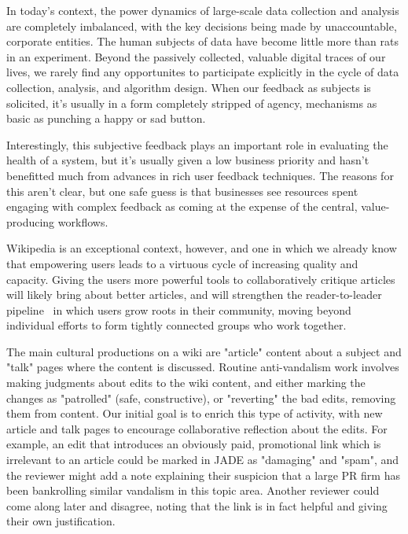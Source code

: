 \documentclass{sigchi-ext}
\begin{document}
In today's context, the power dynamics of large-scale data collection and analysis are completely imbalanced, with the key decisions being made by unaccountable, corporate entities.  The human subjects of data have become little more than rats in an experiment.  Beyond the passively collected, valuable digital traces of our lives, we rarely find any opportunites to participate explicitly in the cycle of data collection, analysis, and algorithm design.  When our feedback as subjects is solicited, it's usually in a form completely stripped of agency, mechanisms as basic as punching a happy or sad button.\cite{levaniemi2012indicator}

Interestingly, this subjective feedback plays an important role in evaluating the health of a system, but it's usually given a low business priority and hasn't benefitted much from advances in rich user feedback techniques.  The reasons for this aren't clear, but one safe guess is that businesses see resources spent engaging with complex feedback as coming at the expense of the central, value-producing workflows.

Wikipedia is an exceptional context, however, and one in which we already know that empowering users leads to a virtuous cycle of increasing quality and capacity.  Giving the users more powerful tools to collaboratively critique articles will likely bring about better articles, and will strengthen the reader-to-leader pipeline~\cite{preece2009reader} in which users grow roots in their community, moving beyond individual efforts to form tightly connected groups who work together.

The main cultural productions on a wiki are "article" content about a subject and "talk" pages where the content is discussed.  Routine anti-vandalism work involves making judgments about edits to the wiki content, and either marking the changes as "patrolled" (safe, constructive), or "reverting" the bad edits, removing them from content.  Our initial goal is to enrich this type of activity, with new article and talk pages to encourage collaborative reflection about the edits.  For example, an edit that introduces an obviously paid, promotional link which is irrelevant to an article could be marked in JADE as "damaging" and "spam", and the reviewer might add a note explaining their suspicion that a large PR firm has been bankrolling similar vandalism in this topic area.  Another reviewer could come along later and disagree, noting that the link is in fact helpful and giving their own justification.
\end{document}
